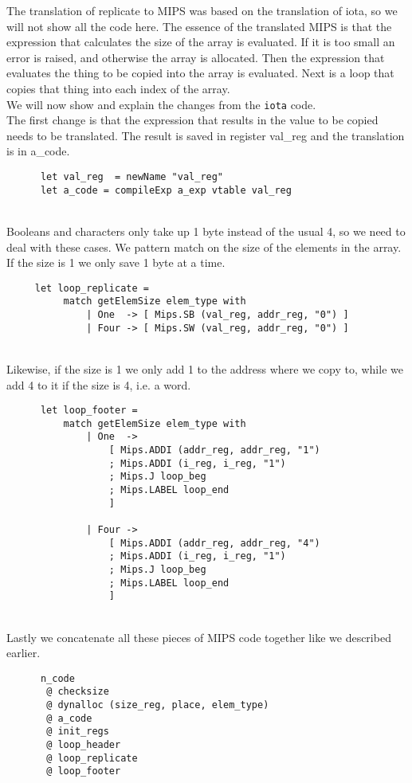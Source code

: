 The translation of replicate to MIPS was based on the translation of iota, so we will not show all the code here. The essence of the translated MIPS is that the expression that calculates the size of the array is evaluated. If it is too small an error is raised, and otherwise the array is allocated. Then the expression that evaluates the thing to be copied into the array is evaluated. Next is a loop that copies that thing into each index of the array. \\

We will now show and explain the changes from the \texttt{iota} code. \\
The first change is that the expression that results in the value to be copied needs to be translated. The result is saved in register val\_reg and the translation is in a\_code.
\begin{verbatim}
      let val_reg  = newName "val_reg"
      let a_code = compileExp a_exp vtable val_reg
\end{verbatim}
~\\

Booleans and characters only take up 1 byte instead of the usual 4, so we need to deal with these cases. We pattern match on the size of the elements in the array. If the size is 1 we only save 1 byte at a time.
\begin{verbatim}
     let loop_replicate =
          match getElemSize elem_type with
              | One  -> [ Mips.SB (val_reg, addr_reg, "0") ]
              | Four -> [ Mips.SW (val_reg, addr_reg, "0") ]
\end{verbatim}
~\\

Likewise, if the size is 1 we only add 1 to the address where we copy to, while we add 4 to it if the size is 4, i.e. a word. 
\begin{verbatim}
      let loop_footer = 
          match getElemSize elem_type with
              | One  ->
                  [ Mips.ADDI (addr_reg, addr_reg, "1")
                  ; Mips.ADDI (i_reg, i_reg, "1")
                  ; Mips.J loop_beg
                  ; Mips.LABEL loop_end
                  ]
 
              | Four ->
                  [ Mips.ADDI (addr_reg, addr_reg, "4")
                  ; Mips.ADDI (i_reg, i_reg, "1")
                  ; Mips.J loop_beg
                  ; Mips.LABEL loop_end
                  ]
\end{verbatim}
~\\

Lastly we concatenate all these pieces of MIPS code together like we described earlier.
\begin{verbatim}
      n_code
       @ checksize
       @ dynalloc (size_reg, place, elem_type)
       @ a_code
       @ init_regs
       @ loop_header
       @ loop_replicate
       @ loop_footer
\end{verbatim}

